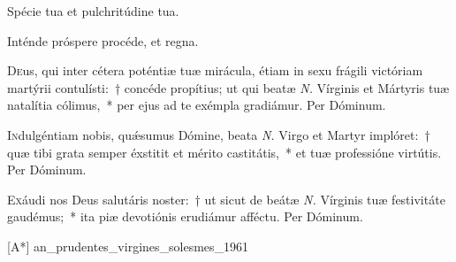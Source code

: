 \documentclass[vesperale_romanum.tex]{subfiles}
\begin{document}


\altertonus



\vel


\vv Spécie tua et pulchritúdine tua. \tpalleluia

\rr Inténde próspere procéde, et regna. \tpalleluia
\label{an_veni_sponsa_christi_i_vesperis_solesmes_1961}
{}


\lettrine{D}{e}us, qui inter cétera poténtiæ tuæ mirácula, étiam in sexu frágili vi\-ctóriam martýrii contulísti:~† concéde propítius; ut qui beatæ \textit{N.} Vírginis et Mártyris tuæ natalítia cólimus,~* per ejus ad te exémpla gradiámur. Per Dóminum.

\aliaoratio

\lettrine{I}{n}dulgéntiam nobis, quǽsumus Dómine, beata \textit{N.} Virgo et Martyr implóret:~† quæ tibi grata semper éxstitit et mérito castitátis,~* et tuæ professióne virtútis. Per Dóminum.



\lettrine{E}{x}áudi nos Deus salutáris noster:~† ut sicut de beátæ \textit{N.} Vírginis tuæ festivitáte gaudémus;~* ita piæ devotiónis erudiámur affé\-ctu.
Per Dóminum.


\label{an_prudentes_virgines_solesmes_1961}

[A*]
{an_prudentes_virgines_solesmes_1961}
\end{document}
